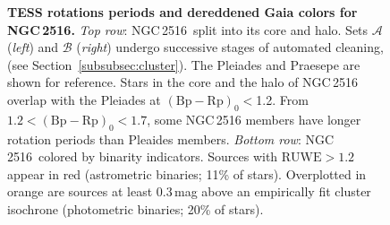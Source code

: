 \documentclass[12pt,twocolumn,tighten]{aastex63}
\newcommand{\cn}{NGC\,2516} %
\newcommand{\bpmrp}{(\mathrm{Bp}-\mathrm{Rp})_0}
\begin{document}
\begin{figure}[t]
\begin{center}
        \vspace{-0.5cm}
	\end{center}
	\vspace{-0.7cm}
  \caption{ {\bf TESS rotations periods and dereddened Gaia colors for
  \cn.} {\it Top row}: \cn\ split into its core and halo.  Sets
  $\mathcal{A}$ ({\it left}) and $\mathcal{B}$ ({\it right}) undergo
  successive stages of automated cleaning, (see
  Section~\ref{subsubsec:cluster}).  The Pleiades
  \citep[125\,Myr;][]{rebull_rotation_2016a} and Praesepe
  \citep[650\,Myr;][]{douglas_poking_2017} are shown for reference.
  Stars in the core and the halo of NGC\,2516 overlap with the
  Pleiades at $\bpmrp$$<$1.2.  From $1.2<\bpmrp<1.7$, some NGC\,2516
  members have longer rotation periods than Pleaides members.  {\it
  Bottom row}: \cn\ colored by binarity indicators.  Sources with
  $\mathrm{RUWE}>1.2$ appear in red (astrometric binaries; 11\% of
  stars).  Overplotted in orange are sources at least 0.3\,mag above
  an empirically fit cluster isochrone (photometric binaries; 20\% of
  stars).
  \label{fig:rot}
	}
\end{figure}
\end{document}
